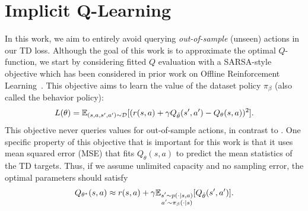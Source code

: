 \documentclass{article} %
\def\Ournamepref{Implicit\xspace}
\begin{document}
\vspace{-0.3cm}

\section{\Ournamepref Q-Learning}

In this work, we aim to entirely avoid querying \emph{out-of-sample} (unseen) actions in our TD loss.
Although the goal of this work is to approximate the optimal $Q$-function, we start by considering fitted $Q$ evaluation with a SARSA-style objective which has been considered in prior work on Offline Reinforcement Learning~\citep{brandfonbrener2021offline, gulcehre2021regularized}. This objective  aims to learn the value of the dataset policy $\pi_\beta$ (also called the behavior policy):
\begin{equation}
\label{eqn:td_sarsa}
L(\theta)=\mathbb{E}_{(s,a,s',a')\sim\mathcal{D}}[(r(s,a) + \gamma Q_{\hat{\theta}}(s', a') - Q_\theta(s,a))^2].
\end{equation}
This objective never queries values for out-of-sample actions, in contrast to . One specific property of this objective that is important for this work is that it uses mean squared error (MSE) that fits $Q_\theta(s,a)$ to predict the mean statistics of the TD targets. Thus, if we assume unlimited capacity and no sampling error, the optimal parameters should satisfy
\begin{equation}
    Q_{\theta^*}(s,a) \approx r(s,a) + \gamma \mathbb{E}_{\substack{s'\sim p(\cdot|s,a)\\a'\sim\pi_\beta(\cdot|s)}}[ Q_{\hat{\theta}}(s',a')].
\label{eqn:q_star}
\end{equation}
\end{document}
